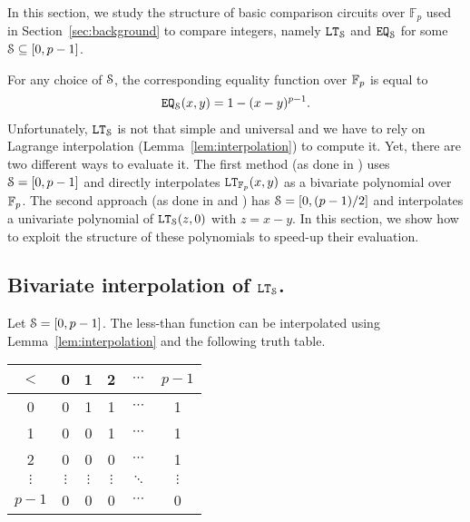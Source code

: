 In this section, we study the structure of basic comparison circuits over $\mathbb{F}_p$ used in Section~\ref{sec:background} to compare integers, namely $\LT_{\S}$ and $\EQ_{\S}$ for some $\S \subseteq [0, p-1]$. 

For any choice of $\S$, the corresponding equality function over $\F_p$ is equal to
\begin{align*}
  \EQ_{\S}(x,y) = 1 - (x-y)^{p-1}.
\end{align*}
Unfortunately, $\LT_{\S}$ is not that simple and universal and we have to rely on Lagrange interpolation (Lemma~\ref{lem:interpolation}) to compute it. 
Yet, there are two different ways to evaluate it.
The first method (as done in \cite{TLWRK20}) uses $\S = [0,p-1]$ and directly interpolates $\LT_{\F_p}(x,y)$ as a bivariate polynomial over $\F_{p}$.
The second approach (as done in \cite{AINA:NGEG17} and \cite{PoPETS:SFR20}) has $\S = [0, (p-1)/2]$ and interpolates a univariate polynomial of $\LT_{\S}(z, 0)$ with $z = x - y$.
In this section, we show how to exploit the structure of these polynomials to speed-up their evaluation.

\subsection{Bivariate interpolation of $\LT_\S$.}

  Let $\S = [0,p-1]$.
  The less-than function can be interpolated using Lemma~\ref{lem:interpolation} and the following truth table.
  \begin{table}[h]
    \centering
    \begin{tabular}{c|ccccc}
        $<$ & 0 & 1 & 2 & $\cdots$ & $p-1$ \\
        \hline
        0 & 0 & 1 & 1 & $\cdots$ & 1 \\
        1 & 0 & 0 & 1 & $\cdots$ & 1 \\
        2 & 0 & 0 & 0 & $\cdots$ & 1 \\
        $\vdots$ & $\vdots$ & $\vdots$ & $\vdots$ & $\ddots$ & $\vdots$ \\
        $p-1$ & 0 & 0 & 0 & $\cdots$ & 0 \\
    \end{tabular}
  \end{table}
    
